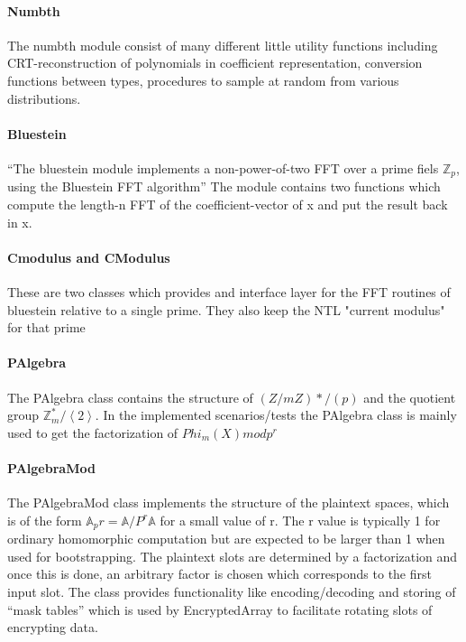 \paragraph{Numbth}
The numbth module consist of many different little utility functions including CRT-reconstruction of polynomials in coefficient representation, conversion functions between types, procedures to sample at random from various distributions\cite{halevi2013design}.

\paragraph{Bluestein}
``The bluestein module implements a non-power-of-two FFT over a prime fiels $\mathbb{Z}_{p}$, using the Bluestein FFT algorithm''\cite{halevi2013design} The module contains two functions which compute the length-n FFT of the coefficient-vector of x and put the result back in x.

\paragraph{Cmodulus and CModulus}
These are two classes which provides and interface layer for the FFT routines of bluestein relative to a single prime. They also keep the NTL "current modulus" for that prime

\paragraph{PAlgebra}
The PAlgebra class contains the structure of $(Z/mZ)* /(p)$ and the quotient group $\mathbb{Z}_{m}^{*}/\left \langle 2 \right \rangle$. In the implemented scenarios/tests the PAlgebra class is mainly used to get the factorization of $Phi_m(X) mod p^r$

\paragraph{PAlgebraMod}
The PAlgebraMod class implements the structure of the plaintext spaces, which is of the form  $\mathbb{A}_{p}{r} = \mathbb{A}/P^{r}\mathbb{A}$ for a small value of r\cite{halevi2013design}. The r value is typically 1 for ordinary homomorphic computation but are expected to be larger than 1 when used for bootstrapping. The plaintext slots are determined by a factorization and once this is done, an arbitrary factor is chosen which corresponds to the first input slot. The class provides functionality like encoding/decoding and storing of ``mask tables'' which is used by EncryptedArray to facilitate rotating slots of encrypting data.
\newpage
